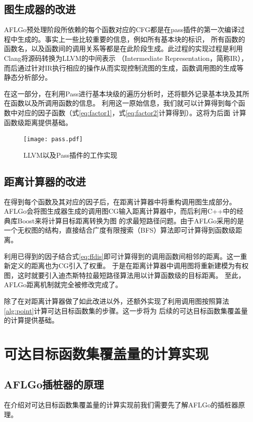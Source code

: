 \documentclass[bachelor]{njupthesis}
\begin{document}
\subsection{图生成器的改进}
AFLGo预处理阶段所依赖的每个函数对应的CFG都是在pass插件的第一次编译过程中生成的。事实上一些比较重要的信息，例如所有基本块的标识，
所有函数的函数名，以及函数间的调用关系等都是在此阶段生成。此过程的实现过程是利用Clang\cite{Clang}将源码转换为LLVM的中间表示
（Intermediate Representation，简称IR），而后通过针对IR执行相应的操作从而实现控制流图的生成，函数调用图的生成等静态分析部分。

在这一部分，在利用Pass进行基本块级的遍历分析时，还将额外记录基本块及其所在函数以及所调用函数的信息。
利用这一原始信息，我们就可以计算得到每个函数中对应的因子函数（式\ref{eq:factor1}，式\ref{eq:factor2}计算得到）。这将为后面
计算函数级距离提供基础。

\begin{figure}[htb]
	\centering
	\texttt{[image: pass.pdf]}
	\caption{LLVM以及Pass插件的工作实现}
 	\label{pic:pass}
\end{figure}

\subsection{距离计算器的改进}
在得到每个函数及其对应的因子后，在距离计算器中将重构调用图生成部分。
AFLGo会将图生成器生成的调用图CG输入距离计算器中，而后利用C++中的经典库Boost\cite{Boost}来将计算目标距离转换为图
的求最短路径问题。由于AFLGo采用的是一个无权图的结构，直接结合广度有限搜索（BFS）算法即可计算得到函数级距离。

利用已得到的因子结合式\ref{eq:ffdis}即可计算得到的调用函数间相邻的距离。这一重新定义的距离也为CG引入了权重。
于是在距离计算器中调用图将重新建模为有权图，这时就要引入迪杰斯特拉最短路径算法用以计算函数级的目标距离。
至此，AFLGo距离机制就完全被修改完成了。

除了在对距离计算器做了如此改进以外，还额外实现了利用调用图按照算法\ref{alg:point}计算可达目标函数集的步骤。这一步将为
后续的可达目标函数集覆盖量的计算提供基础。

\section{可达目标函数集覆盖量的计算实现}
\subsection{AFLGo插桩器的原理}
在介绍对可达目标函数集覆盖量的计算实现前我们需要先了解AFLGo的插桩器原理。
\end{document}
